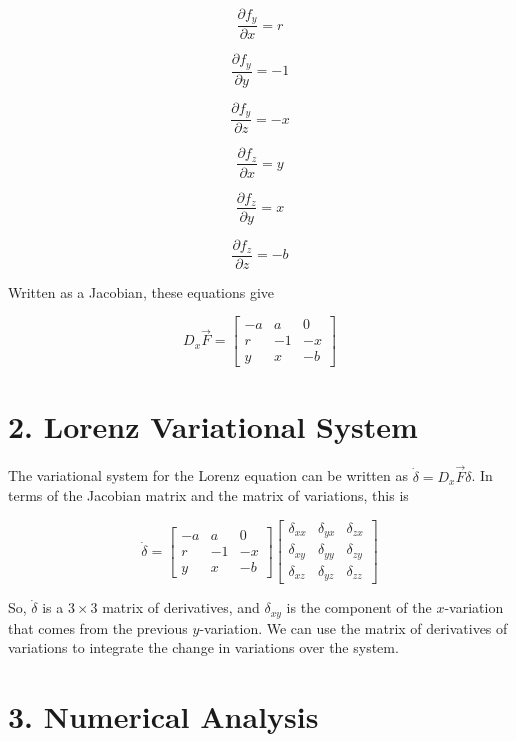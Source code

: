 \documentclass[12pt, letterpaper]{article}
\begin{document}
\begin{equation}
\frac{\partial f_y}{\partial x} = r
\end{equation}

\begin{equation}
\frac{\partial f_y}{\partial y} = -1
\end{equation}

\begin{equation}
\frac{\partial f_y}{\partial z} = -x
\end{equation}

\begin{equation}
\frac{\partial f_z}{\partial x} = y
\end{equation}

\begin{equation}
\frac{\partial f_z}{\partial y} = x
\end{equation}

\begin{equation}
\frac{\partial f_z}{\partial z} = -b
\end{equation}

Written as a Jacobian, these equations give

\begin{equation}
D_x\vec{F} = \left[ \begin{array}{ccc}
-a & a & 0 \\
r & -1 & -x \\
y & x & -b 
\end{array} \right]
\end{equation}

\section*{2. Lorenz Variational System}

The variational system for the Lorenz equation can be written as $\dot{\delta}
= D_x\vec{F}\delta$. In terms of the Jacobian matrix and the matrix of variations,
this is

\begin{equation}
\dot{\delta} = \left[ \begin{array}{ccc}
-a & a & 0 \\
r & -1 & -x \\
y & x & -b
\end{array} \right] \left[ \begin{array}{ccc}
\delta_{xx} & \delta_{yx} & \delta_{zx} \\
\delta_{xy} & \delta_{yy} & \delta_{zy} \\
\delta_{xz} & \delta_{yz} & \delta_{zz} 
\end{array} \right]
\end{equation}

So, $\dot{\delta}$ is a $3 \times 3$ matrix of derivatives, and $\delta_{xy}$ is
the component of the $x$-variation that comes from the previous $y$-variation. 
We can use the matrix of derivatives of variations to integrate the change in 
variations over the system.

\section*{3. Numerical Analysis}
\end{document}
